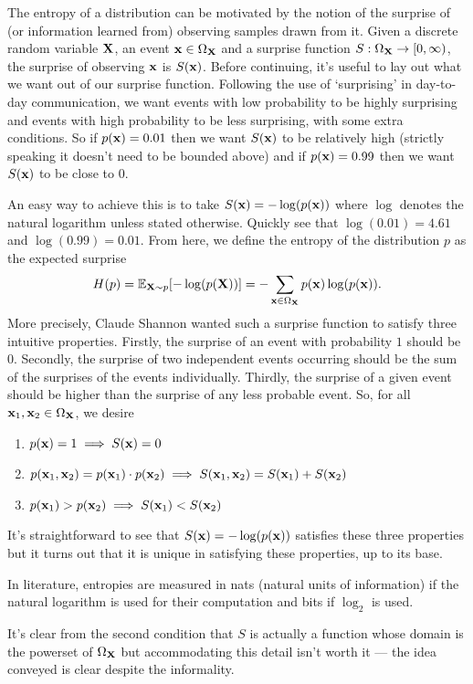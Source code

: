 \documentclass[11pt]{article}
\begin{document}
\begin{appendices}
The entropy of a distribution can be motivated by the notion of the surprise of (or information learned from) observing samples drawn from it. Given a discrete random variable $\mathbf{X}$, an event $\mathbf{x}\in\Omega_{\mathbf{X}}$ and a surprise function $S:\Omega_{\mathbf{X}}\rightarrow[0,\infty)$, the surprise of observing $\mathbf{x}$ is $S(\mathbf{x})$. Before continuing, it's useful to lay out what we want out of our surprise function. Following the use of `surprising' in day-to-day communication, we want events with low probability to be highly surprising and events with high probability to be less surprising, with some extra conditions. So if $p(\mathbf{x})=0.01$ then we want $S(\mathbf{x})$ to be relatively high (strictly speaking it doesn't need to be bounded above) and if $p(\mathbf{x})=0.99$ then we want $S(\mathbf{x})$ to be close to 0.

An easy way to achieve this is to take $S(\mathbf{x})=-\log(p(\mathbf{x}))$ where $\log$ denotes the natural logarithm unless stated otherwise. Quickly see that $\log(0.01)=4.61$ and $\log(0.99)=0.01$. From here, we define the entropy of the distribution $p$ as the expected surprise
$$
H(p)
=
\mathbb{E}_{\mathbf{X}\sim p}[-\log(p(\mathbf{X}))]
=
-\sum_{\mathbf{x}\in \Omega_{\mathbf{X}}}p(\mathbf{x})\log(p(\mathbf{x})).
$$
More precisely, Claude Shannon wanted such a surprise function to satisfy three intuitive properties. Firstly, the surprise of an event with probability $1$ should be $0$. Secondly, the surprise of two independent events occurring should be the sum of the surprises of the events individually. Thirdly, the surprise of a given event should be higher than the surprise of any less probable event. So, for all $\mathbf{x}_1,\mathbf{x}_2\in\Omega_{\mathbf{X}}$, we desire
\begin{enumerate}
    \item $p(\mathbf{x})=1\implies S(\mathbf{x})=0$
    \item $p(\mathbf{x}_1,\mathbf{x}_2)=p(\mathbf{x}_1)\cdot p(\mathbf{x}_2)\implies S(\mathbf{x}_1,\mathbf{x}_2)=S(\mathbf{x}_1)+S(\mathbf{x}_2)$
    \item $p(\mathbf{x}_1)>p(\mathbf{x}_2)\implies S(\mathbf{x}_1)<S(\mathbf{x}_2)$
\end{enumerate}
It's straightforward to see that $S(\mathbf{x})=-\log(p(\mathbf{x}))$ satisfies these three properties but it turns out that it is unique in satisfying these properties, up to its base.

In literature, entropies are measured in nats (natural units of information) if the natural logarithm is used for their computation and bits if $\log_2$ is used.

\begin{tcolorbox}[title={\centering\textbf{Technical note regarding} $\text{dom}(S)$}, colback=myLightBlue, colbacktitle=myDarkBlue, colframe=myDarkBlue, coltitle=white]
    It's clear from the second condition that $S$ is actually a function whose domain is the powerset of $\Omega_{\mathbf{X}}$ but accommodating this detail isn't worth it — the idea conveyed is clear despite the informality.
\end{tcolorbox}


\end{appendices}
\end{document}
